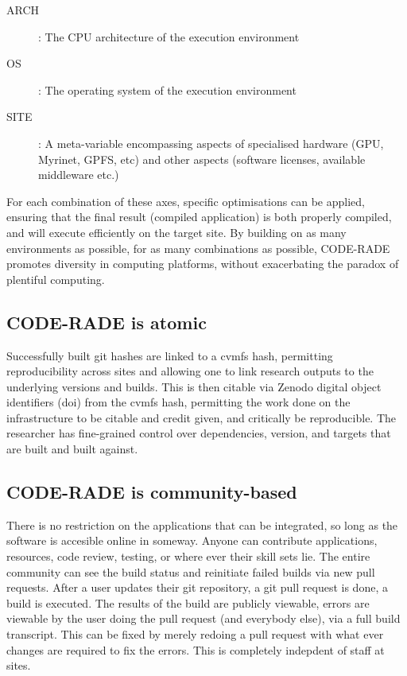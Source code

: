\documentclass[a4paper]{jpconf}
\begin{document}
\begin{description}
	\item[ARCH]: The CPU architecture of the execution environment
	\item[OS]: The operating system of the execution environment
    \item[SITE]: A meta-variable encompassing aspects of specialised hardware (GPU, Myrinet, GPFS,
        etc) and other aspects (software licenses, available middleware etc.)
\end{description}

For each combination of these axes, specific optimisations can be applied, ensuring that the final
result (compiled application) is both properly compiled, and will execute efficiently on the target
site.
By building on as many environments as possible, for as many combinations as possible, CODE-RADE
promotes diversity in computing platforms, without exacerbating the paradox of plentiful computing.

\subsection{CODE-RADE is atomic}

Successfully built git hashes are linked to a cvmfs hash, permitting reproducibility across sites and 
allowing one to link research outputs to the underlying versions and builds. This is then citable via
Zenodo digital object identifiers (doi) from the cvmfs hash, permitting the work done on the 
infrastructure to be citable and credit given, and critically be reproducible.
The researcher has fine-grained control over dependencies, version, and targets that are built
and built against. 

\subsection{CODE-RADE is community-based}
There is no restriction on the applications that can be integrated, so long as the software is accesible
online in someway. Anyone can contribute applications, resources, code review, testing, or
where ever their skill sets lie. 
The entire community can see the build status and reinitiate failed builds via new pull requests.
After a user updates their git repository, a git pull request is done, a build is executed. 
The results of the build are publicly viewable, 
errors are viewable by the user doing the pull request (and everybody else), via a full build transcript.
This can be fixed
by merely redoing a pull request with what ever changes are required to fix the errors. 
This is completely indepdent of staff at sites.
\end{document}
